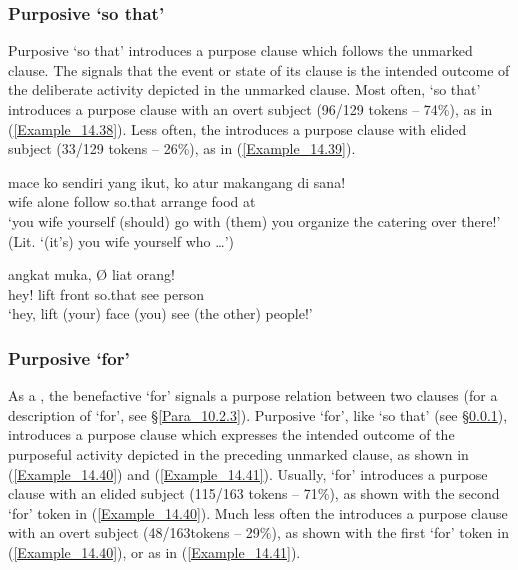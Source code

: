 \subsubsection[Purposive supaya ‘so that’]{Purposive  ‘so that’}
\label{Para_14.2.4.2}
Purposive  ‘so that’ introduces a purpose clause which follows the unmarked clause. The  signals that the event or state of its clause is the intended outcome of the deliberate activity depicted in the unmarked clause. Most often,  ‘so that’ introduces a purpose clause with an overt subject (96/129 tokens – 74\%), as in (\ref{Example_14.38}). Less often, the  introduces a purpose clause with elided subject (33/129 tokens – 26\%), as in (\ref{Example_14.39}).
%

\ea
\label{Example_14.38}
\gll mace  ko  sendiri  yang  ikut,    ko  atur makangang  di  sana!\\  
wife    alone    follow  so.that    arrange food  at  \\
\glt ‘you wife yourself (should) go with (them)  you organize the catering over there!’ (Lit. ‘(it’s) you wife yourself who {\ldots}’) \textstyleExampleSource{[081025-009a-Cv.0032]}
\z

\ea\label{Example_14.39}
 {angkat} {muka,} {} {Ø} {liat} {orang!}\\ %
 hey!  lift  front  so.that  {}  see  person\\
\glt ‘hey, lift (your) face   (you) see (the other) people!’ \textstyleExampleSource{[081110-008-CvNP.0101]}
\z

\subsubsection[Purposive untuk ‘for’]{Purposive  ‘for’}
\label{Para_14.2.4.3}
As a , the benefactive   ‘for’ signals a purpose relation between two clauses (for a description of   ‘for’, see §\ref{Para_10.2.3}). Purposive  ‘for’, like  ‘so that’ (see §\ref{Para_14.2.4.2}), introduces a purpose clause which expresses the intended outcome of the purposeful activity depicted in the preceding unmarked clause, as shown in (\ref{Example_14.40}) and (\ref{Example_14.41}). Usually,  ‘for’ introduces a purpose clause with an elided subject (115/163 tokens – 71\%), as shown with the second  ‘for’ token in (\ref{Example_14.40}). Much less often the  introduces a purpose clause with an overt subject (48/163tokens – 29\%), as shown with the first  ‘for’ token in (\ref{Example_14.40}), or as in (\ref{Example_14.41}).
%

